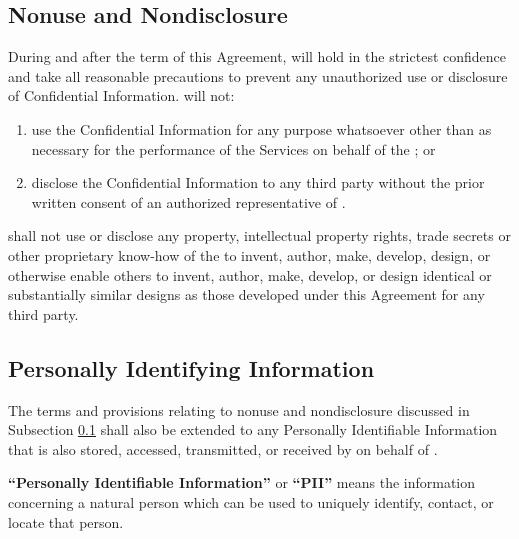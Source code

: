 {    \subsection{Nonuse and Nondisclosure}\label{nondisclosure}
    During and after the term of this Agreement, \counterpartytitle will hold in the strictest confidence and take all reasonable precautions to prevent any unauthorized use or disclosure of Confidential Information. \counterpartytitle will not:
      \begin{enumerate}
        \item use the Confidential Information for any purpose whatsoever other than as necessary for the performance of the Services on behalf of the \companyname; or
        \item disclose the Confidential Information to any third party without the prior written consent of an authorized representative of \companyname.
      \end{enumerate}
      \counterpartytitle shall not use or disclose any \companyname property, intellectual property rights, trade secrets or other proprietary know-how of the \companyname to invent, author, make, develop, design, or otherwise enable others to invent, author, make, develop, or design identical or substantially similar designs as those developed under this Agreement for any third party.

    \subsection{Personally Identifying Information}
    The terms and provisions relating to nonuse and nondisclosure discussed in Subsection \ref{nondisclosure} shall also be extended to any Personally Identifiable Information that is also stored, accessed, transmitted, or received by \counterpartytitle on behalf of \companyname.

    \textbf{``Personally Identifiable Information''} or \textbf{``PII''} means the information concerning a natural person which can be used to uniquely identify, contact, or locate that person.
}

